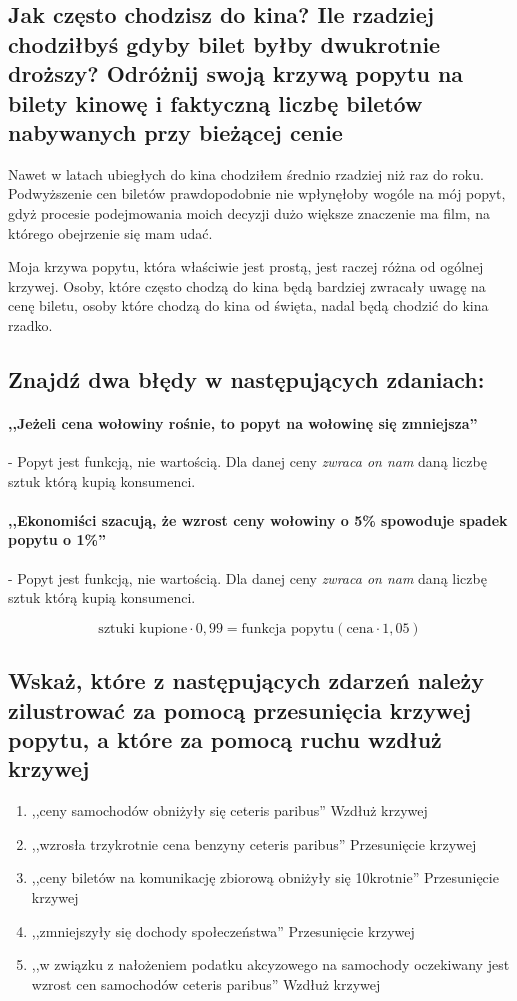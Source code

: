 \documentclass[a4paper,12pt]{article}
\begin{document}
\subsection{Jak często chodzisz do kina? Ile rzadziej chodziłbyś gdyby bilet byłby dwukrotnie droższy? Odróżnij swoją krzywą popytu na bilety kinowę i faktyczną liczbę biletów nabywanych przy bieżącej cenie}

Nawet w latach ubiegłych do kina chodziłem średnio rzadziej niż raz do roku. Podwyższenie cen biletów prawdopodobnie nie wpłynęłoby wogóle na mój popyt, gdyż procesie podejmowania moich decyzji dużo większe znaczenie ma film, na którego obejrzenie się mam udać.

Moja krzywa popytu, która właściwie jest prostą, jest raczej różna od ogólnej krzywej. Osoby, które często chodzą do kina będą bardziej zwracały uwagę na cenę biletu, osoby które chodzą do kina od święta, nadal będą chodzić do kina rzadko.

\subsection{Znajdź dwa błędy w następujących zdaniach:}

\paragraph*{,,Jeżeli cena wołowiny rośnie, to popyt na wołowinę się zmniejsza''} - Popyt jest funkcją, nie wartością. Dla danej ceny \emph{zwraca on nam} daną liczbę sztuk którą kupią konsumenci.

\paragraph*{,,Ekonomiści szacują, że wzrost ceny wołowiny o 5\% spowoduje spadek popytu o 1\%''} -  Popyt jest funkcją, nie wartością. Dla danej ceny \emph{zwraca on nam} daną liczbę sztuk którą kupią konsumenci.

\[
	\text{sztuki kupione} \cdot 0,99 = \text{funkcja popytu}\left(\text{cena} \cdot 1,05 \right)
\]

\subsection{Wskaż, które z następujących zdarzeń należy zilustrować za pomocą przesunięcia krzywej popytu, a które za pomocą ruchu wzdłuż krzywej}

\begin{enumerate}
	\item ,,ceny samochodów obniżyły się ceteris paribus'' Wzdłuż krzywej
	\item ,,wzrosła trzykrotnie cena benzyny ceteris paribus'' Przesunięcie krzywej
	\item ,,ceny biletów na komunikację zbiorową obniżyły się 10krotnie'' Przesunięcie krzywej
	\item ,,zmniejszyły się dochody społeczeństwa'' Przesunięcie krzywej
	\item ,,w związku z nałożeniem podatku akcyzowego na samochody oczekiwany jest wzrost cen samochodów ceteris paribus'' Wzdłuż krzywej
\end{enumerate}
\end{document}
